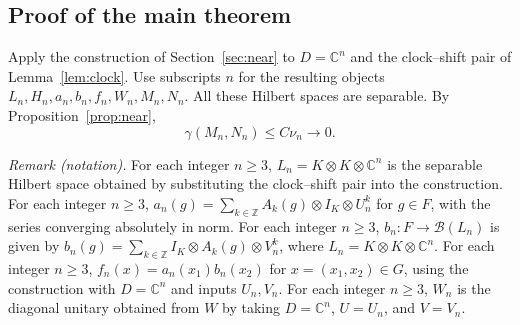 \subsection{Proof of the main theorem}
Apply the construction of Section~\ref{sec:near} to
$D=\mathbb C^n$ and the clock--shift pair of Lemma~\ref{lem:clock}.
Use subscripts $n$ for the resulting objects $L_n,H_n,a_n,b_n,f_n,W_n,
M_n,N_n$. All these Hilbert spaces are separable. By
Proposition~\ref{prop:near},
\begin{equation}\label{eq:vanishing-gap}
 \gamma(M_n,N_n)\leq C\nu_n\longrightarrow0.
\end{equation}

\noindent\textit{Remark (notation).} For each integer $n\geq3$, $L_n=K\otimes K\otimes\mathbb C^n$ is the separable Hilbert space obtained by substituting the clock--shift pair into the construction. For each integer $n\geq3$, $a_n(g)=\sum_{k\in\mathbb Z}A_k(g)\otimes I_K\otimes U_n^k$ for $g\in F$, with the series converging absolutely in norm. For each integer $n\geq3$, $b_n:F\to\mathcal B(L_n)$ is given by $b_n(g)=\sum_{k\in\mathbb Z}I_K\otimes A_k(g)\otimes V_n^k$, where $L_n=K\otimes K\otimes\mathbb C^n$. For each integer $n\geq3$, $f_n(x)=a_n(x_1)b_n(x_2)$ for $x=(x_1,x_2)\in G$, using the construction with $D=\mathbb C^n$ and inputs $U_n,V_n$. For each integer $n\geq3$, $W_n$ is the diagonal unitary obtained from $W$ by taking $D=\mathbb C^n$, $U=U_n$, and $V=V_n$.


